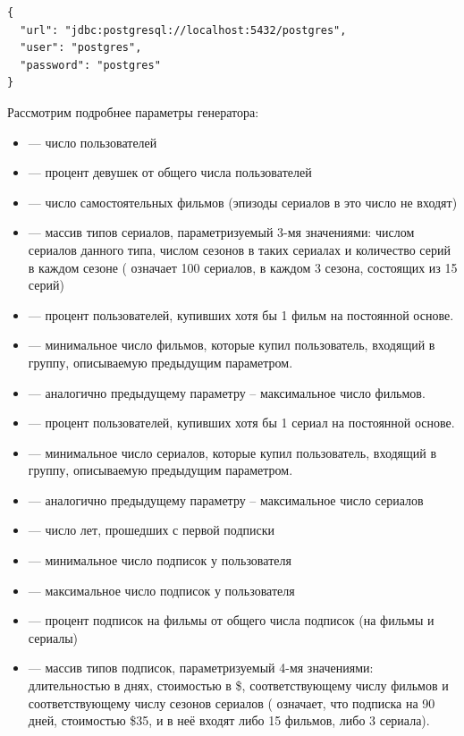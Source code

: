 \begin{lstlisting}[label={lst:db.json},caption={Пример параметров доступа к \code{Postgres}-серверу}]
{
  "url": "jdbc:postgresql://localhost:5432/postgres",
  "user": "postgres",
  "password": "postgres"
}
\end{lstlisting}



Рассмотрим подробнее параметры генератора:

\begin{itemize}
	\item {} --- число пользователей
	\item {} --- процент девушек от общего числа пользователей
	\item {} --- число самостоятельных фильмов (эпизоды сериалов в это число не входят)
	\item {} --- массив типов сериалов, параметризуемый 3-мя значениями: числом сериалов данного типа, числом сезонов в таких сериалах и количество серий в каждом сезоне (\code{[100, 3, 15]} означает 100 сериалов, в каждом 3 сезона, состоящих из 15 серий)
	\item {} --- процент пользователей, купивших хотя бы 1 фильм на постоянной основе.
	\item {} --- минимальное число фильмов, которые купил пользователь, входящий в группу, описываемую предыдущим параметром.
	\item {} --- аналогично предыдущему параметру -- максимальное число фильмов.
	\item {} --- процент пользователей, купивших хотя бы 1 сериал на постоянной основе.
	\item {} --- минимальное число сериалов, которые купил пользователь, входящий в группу, описываемую предыдущим параметром.
	\item {} --- аналогично предыдущему параметру -- максимальное число сериалов
	\item {} --- число лет, прошедших с первой подписки
	\item {} --- минимальное число подписок у пользователя
	\item {} --- максимальное число подписок у пользователя
	\item {} --- процент подписок на фильмы от общего числа подписок (на фильмы и сериалы)
	\item {} --- массив типов подписок, параметризуемый 4-мя значениями: длительностью в днях, стоимостью в \$, соответствующему числу фильмов и соответствующему числу сезонов сериалов (\code{[90, 35, 15, 3]} означает, что подписка на 90 дней, стоимостью \$35, и в неё входят либо 15 фильмов, либо 3 сериала).



\end{itemize}
